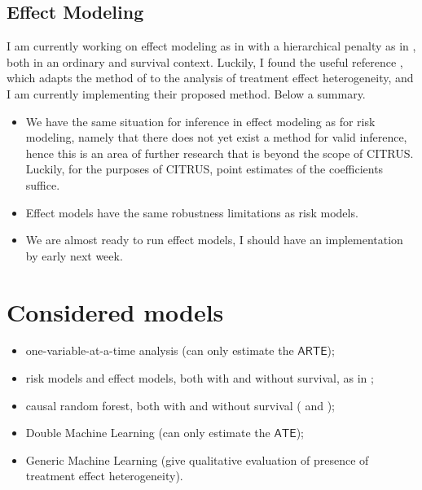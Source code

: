 \documentclass[11pt]{article}
\begin{document}
\subsection{Effect Modeling}
I am currently working on effect modeling as in \cite{kent2020path} with a hierarchical penalty as in \cite{bien2013}, both in an ordinary and survival context. Luckily, I found the useful reference \cite{du2021}, which adapts the method of \cite{bien2013} to the analysis of treatment effect heterogeneity, and I am currently implementing their proposed method. Below a summary.
\begin{itemize}
	\item We have the same situation for inference in effect modeling  as for risk modeling, namely that there does not yet exist a method for valid inference, hence this is an area of further research that is beyond the scope of CITRUS. Luckily, for the purposes of CITRUS, point estimates of the coefficients suffice.
	\item Effect models have the same robustness limitations as risk models.
	\item We are almost ready to run effect models, I should have an implementation by early next week.
\end{itemize}


\section{Considered models} 
\begin{itemize}
    \item one-variable-at-a-time analysis (can only estimate the $\textsf{ARTE}$);
    \item risk models and effect models, both with and without survival, as in \cite{kent2020path};
    \item causal random forest, both with and without survival (\citealp{athey2019grf} and \citealp{cui2021estimating});
    \item Double Machine Learning \citep{chernozhukov2018double} (can only estimate the $\textsf{ATE}$);
    \item Generic Machine Learning \citep{chernozhukov2020generic} (give qualitative evaluation of presence of treatment effect heterogeneity).
\end{itemize}
\end{document}
